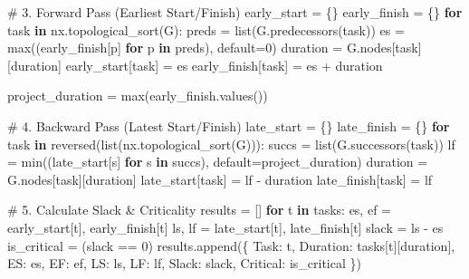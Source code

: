 \documentclass[
  letterpaper,
  DIV=11,
  numbers=noendperiod]{scrreprt}
\newenvironment{Shaded}{\begin{snugshade}}{\end{snugshade}}
\newcommand{\BuiltInTok}[1]{\textcolor[rgb]{0.00,0.23,0.31}{#1}}
\newcommand{\CommentTok}[1]{\textcolor[rgb]{0.37,0.37,0.37}{#1}}
\newcommand{\ControlFlowTok}[1]{\textcolor[rgb]{0.00,0.23,0.31}{\textbf{#1}}}
\newcommand{\DecValTok}[1]{\textcolor[rgb]{0.68,0.00,0.00}{#1}}
\newcommand{\KeywordTok}[1]{\textcolor[rgb]{0.00,0.23,0.31}{\textbf{#1}}}
\newcommand{\NormalTok}[1]{\textcolor[rgb]{0.00,0.23,0.31}{#1}}
\newcommand{\OperatorTok}[1]{\textcolor[rgb]{0.37,0.37,0.37}{#1}}
\newcommand{\StringTok}[1]{\textcolor[rgb]{0.13,0.47,0.30}{#1}}
\begin{document}
\begin{Shaded}
\begin{Highlighting}[]
\CommentTok{\# 3. Forward Pass (Earliest Start/Finish)}
\NormalTok{early\_start }\OperatorTok{=}\NormalTok{ \{\}}
\NormalTok{early\_finish }\OperatorTok{=}\NormalTok{ \{\}}
\ControlFlowTok{for}\NormalTok{ task }\KeywordTok{in}\NormalTok{ nx.topological\_sort(G):}
\NormalTok{    preds }\OperatorTok{=} \BuiltInTok{list}\NormalTok{(G.predecessors(task))}
\NormalTok{    es }\OperatorTok{=} \BuiltInTok{max}\NormalTok{((early\_finish[p] }\ControlFlowTok{for}\NormalTok{ p }\KeywordTok{in}\NormalTok{ preds), default}\OperatorTok{=}\DecValTok{0}\NormalTok{)}
\NormalTok{    duration }\OperatorTok{=}\NormalTok{ G.nodes[task][}\StringTok{\textquotesingle{}duration\textquotesingle{}}\NormalTok{]}
\NormalTok{    early\_start[task] }\OperatorTok{=}\NormalTok{ es}
\NormalTok{    early\_finish[task] }\OperatorTok{=}\NormalTok{ es }\OperatorTok{+}\NormalTok{ duration}

\NormalTok{project\_duration }\OperatorTok{=} \BuiltInTok{max}\NormalTok{(early\_finish.values())}

\CommentTok{\# 4. Backward Pass (Latest Start/Finish)}
\NormalTok{late\_start }\OperatorTok{=}\NormalTok{ \{\}}
\NormalTok{late\_finish }\OperatorTok{=}\NormalTok{ \{\}}
\ControlFlowTok{for}\NormalTok{ task }\KeywordTok{in} \BuiltInTok{reversed}\NormalTok{(}\BuiltInTok{list}\NormalTok{(nx.topological\_sort(G))):}
\NormalTok{    succs }\OperatorTok{=} \BuiltInTok{list}\NormalTok{(G.successors(task))}
\NormalTok{    lf }\OperatorTok{=} \BuiltInTok{min}\NormalTok{((late\_start[s] }\ControlFlowTok{for}\NormalTok{ s }\KeywordTok{in}\NormalTok{ succs), default}\OperatorTok{=}\NormalTok{project\_duration)}
\NormalTok{    duration }\OperatorTok{=}\NormalTok{ G.nodes[task][}\StringTok{\textquotesingle{}duration\textquotesingle{}}\NormalTok{]}
\NormalTok{    late\_start[task] }\OperatorTok{=}\NormalTok{ lf }\OperatorTok{{-}}\NormalTok{ duration}
\NormalTok{    late\_finish[task] }\OperatorTok{=}\NormalTok{ lf}

\CommentTok{\# 5. Calculate Slack \& Criticality}
\NormalTok{results }\OperatorTok{=}\NormalTok{ []}
\ControlFlowTok{for}\NormalTok{ t }\KeywordTok{in}\NormalTok{ tasks:}
\NormalTok{    es, ef }\OperatorTok{=}\NormalTok{ early\_start[t], early\_finish[t]}
\NormalTok{    ls, lf }\OperatorTok{=}\NormalTok{ late\_start[t], late\_finish[t]}
\NormalTok{    slack }\OperatorTok{=}\NormalTok{ ls }\OperatorTok{{-}}\NormalTok{ es}
\NormalTok{    is\_critical }\OperatorTok{=}\NormalTok{ (slack }\OperatorTok{==} \DecValTok{0}\NormalTok{)}
\NormalTok{    results.append(\{}
        \StringTok{\textquotesingle{}Task\textquotesingle{}}\NormalTok{: t, }\StringTok{\textquotesingle{}Duration\textquotesingle{}}\NormalTok{: tasks[t][}\StringTok{\textquotesingle{}duration\textquotesingle{}}\NormalTok{],}
        \StringTok{\textquotesingle{}ES\textquotesingle{}}\NormalTok{: es, }\StringTok{\textquotesingle{}EF\textquotesingle{}}\NormalTok{: ef, }\StringTok{\textquotesingle{}LS\textquotesingle{}}\NormalTok{: ls, }\StringTok{\textquotesingle{}LF\textquotesingle{}}\NormalTok{: lf,}
        \StringTok{\textquotesingle{}Slack\textquotesingle{}}\NormalTok{: slack, }\StringTok{\textquotesingle{}Critical\textquotesingle{}}\NormalTok{: is\_critical}
\NormalTok{    \})}


\end{Highlighting}
\end{Shaded}
\end{document}
